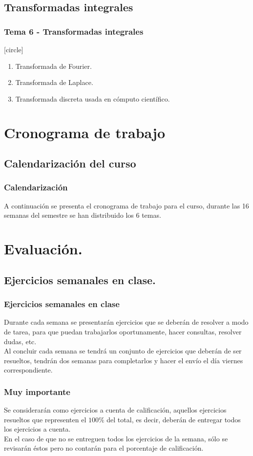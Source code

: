 \subsection{Transformadas integrales}
\begin{frame}
\frametitle{Tema 6 - Transformadas integrales}
[circle]
\begin{enumerate}[<+->]
\item Transformada de Fourier.
\item Transformada de Laplace.
\item Transformada discreta usada en cómputo científico.
\end{enumerate}
\end{frame}
\section{Cronograma de trabajo}
\subsection{Calendarización del curso}
\begin{frame}
\frametitle{Calendarización}
A continuación se presenta el cronograma de trabajo para el curso, durante las 16 semanas del semestre se han distribuido los 6 temas.
\end{frame}
{

}
\section{Evaluación.}
\subsection{Ejercicios semanales en clase.}
\begin{frame}
\frametitle{Ejercicios semanales en clase}
Durante cada semana se presentarán ejercicios que se deberán de resolver a modo de tarea, para que puedan trabajarlos oportunamente, hacer consultas, resolver dudas, etc.
\\
\bigskip
\pause
Al concluir cada semana se tendrá un conjunto de ejercicios que deberán de ser resueltos, tendrán dos semanas para completarlos y hacer el envío el día viernes correspondiente.
\end{frame}
\begin{frame}
\frametitle{Muy importante}
Se considerarán como ejercicios a cuenta de calificación, aquellos ejercicios resueltos que representen el $100\%$ del total, es decir, deberán de entregar todos los ejercicios a cuenta.
\\
\bigskip
\pause
En el caso de que no se entreguen todos los ejercicios de la semana, sólo se revisarán éstos pero no contarán para el porcentaje de calificación.
\end{frame}
